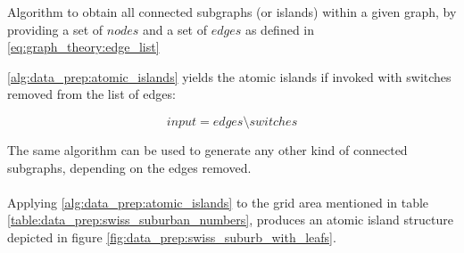\begin{algorithm}[h!]
    \LinesNumbered
    \SetAlgoNoEnd
    \SetAlgoVlined
    \DontPrintSemicolon




    \caption{
        Algorithm to obtain all connected subgraphs (or islands) within a given graph, by providing
        a set of $nodes$ and a set of $edges$ as defined in \autoref{eq:graph_theory:edge_list}
    }
    \label{alg:data_prep:atomic_islands}
\end{algorithm}

\autoref{alg:data_prep:atomic_islands} yields the atomic islands if invoked 
with switches removed from the list of edges:

\begin{equation}
    input = edges \setminus switches
\end{equation}

The same algorithm can be used to generate any other kind of connected subgraphs,
depending on the edges removed.\\
\\
Applying \ref{alg:data_prep:atomic_islands} to the grid area mentioned in table \ref{table:data_prep:swiss_suburban_numbers},
produces an atomic island structure depicted in figure \ref{fig:data_prep:swiss_suburb_with_leafs}.


